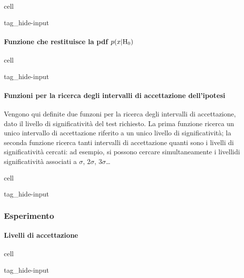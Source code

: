 \documentclass[letterpaper,10pt,italian]{jupyterBook}
\begin{document}
\begin{sphinxuseclass}{cell}
\begin{sphinxuseclass}{tag_hide-input}
\end{sphinxuseclass}
\end{sphinxuseclass}

\paragraph{Funzione che restituisce la pdf \protect\(p(x|\text{H}_0)\protect\)}
\label{\detokenize{ch/statistics/test-fisher-coin-2:funzione-che-restituisce-la-pdf-p-x-text-h-0}}
\begin{sphinxuseclass}{cell}
\begin{sphinxuseclass}{tag_hide-input}
\end{sphinxuseclass}
\end{sphinxuseclass}

\paragraph{Funzioni per la ricerca degli intervalli di accettazione dell’ipotesi}
\label{\detokenize{ch/statistics/test-fisher-coin-2:funzioni-per-la-ricerca-degli-intervalli-di-accettazione-dell-ipotesi}}
\sphinxAtStartPar
Vengono qui definite due funzoni per la ricerca degli intervalli di accettazione, dato il livello di significatività del test richiesto. La prima funzione ricerca un unico intervallo di accettazione riferito a un unico livello di significatività; la seconda funzione ricerca tanti intervalli di accettazione quanti sono i livelli di significatività cercati: ad esempio, si possono cercare simultaneamente i livellidi significatività associati a \(\sigma\), \(2 \sigma\), \(3 \sigma\)…

\begin{sphinxuseclass}{cell}
\begin{sphinxuseclass}{tag_hide-input}
\end{sphinxuseclass}
\end{sphinxuseclass}

\subsubsection{Esperimento}
\label{\detokenize{ch/statistics/test-fisher-coin-2:esperimento}}

\paragraph{Livelli di accettazione}
\label{\detokenize{ch/statistics/test-fisher-coin-2:livelli-di-accettazione}}
\begin{sphinxuseclass}{cell}
\begin{sphinxuseclass}{tag_hide-input}
\end{sphinxuseclass}
\end{sphinxuseclass}
\end{document}
